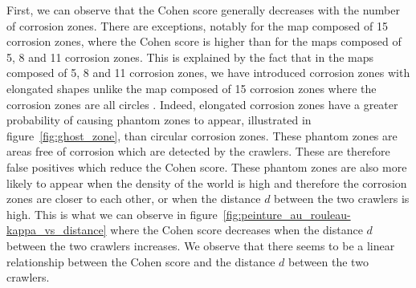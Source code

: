 \documentclass[english,RandD]{rapportPFE}  %
\begin{document}
			First, we can observe that the Cohen score generally decreases with the number of corrosion zones.
			There are exceptions, notably for the map composed of 15 corrosion zones, where the Cohen score is higher than for the maps composed of 5, 8 and 11 corrosion zones.
			This is explained by the fact that in the maps composed of 5, 8 and 11 corrosion zones, we have introduced corrosion zones with elongated shapes unlike the map composed of 15 corrosion zones where the corrosion zones are all circles .
			Indeed, elongated corrosion zones have a greater probability of causing phantom zones to appear, illustrated in figure~\ref{fig:ghost_zone}, than circular corrosion zones.
			These phantom zones are areas free of corrosion which are detected by the crawlers.
			These are therefore false positives which reduce the Cohen score.
			These phantom zones are also more likely to appear when the density of the world is high and therefore the corrosion zones are closer to each other, or when the distance $d$ between the two crawlers is high.
			This is what we can observe in figure~\ref{fig:peinture_au_rouleau-kappa_vs_distance} where the Cohen score decreases when the distance $d$ between the two crawlers increases.
			We observe that there seems to be a linear relationship between the Cohen score and the distance $d$ between the two crawlers.
\end{document}
